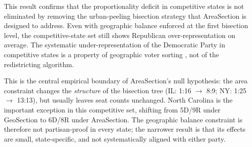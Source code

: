 This result confirms that the proportionality deficit in competitive states
is not eliminated by removing the urban-peeling bisection strategy that
AreaSection is designed to address.
Even with geographic balance enforced at the first bisection level, the
competitive-state set still shows Republican over-representation on average.
The systematic under-representation of the Democratic Party in competitive
states is a property of geographic voter sorting
\citep{rodden2019,chen2013}, not of the redistricting algorithm.

This is the central empirical boundary of AreaSection's null hypothesis:
the area constraint changes the \emph{structure} of the bisection tree
(IL: 1:16 $\to$ 8:9; NY: 1:25 $\to$ 13:13), but usually leaves seat counts
unchanged.
North Carolina is the important exception in this competitive set, shifting
from 5D/9R under GeoSection to 6D/8R under AreaSection.
The geographic balance constraint is therefore not partisan-proof in every
state; the narrower result is that its effects are small, state-specific, and
not systematically aligned with either party.
